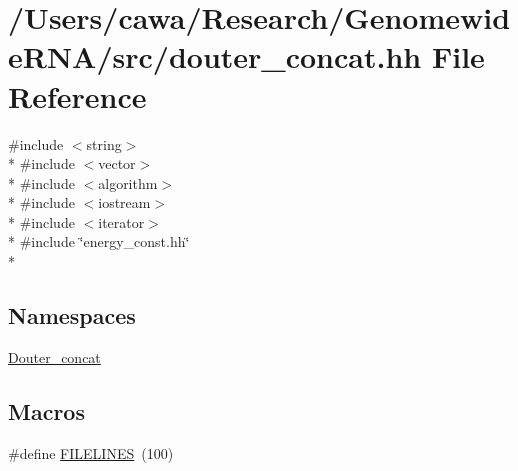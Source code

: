 \hypertarget{douter__concat_8hh}{\section{/\+Users/cawa/\+Research/\+Genomewide\+R\+N\+A/src/douter\+\_\+concat.hh File Reference}
\label{douter__concat_8hh}
}
{\ttfamily \#include $<$string$>$}\\*
{\ttfamily \#include $<$vector$>$}\\*
{\ttfamily \#include $<$algorithm$>$}\\*
{\ttfamily \#include $<$iostream$>$}\\*
{\ttfamily \#include $<$iterator$>$}\\*
{\ttfamily \#include \char`\"{}energy\+\_\+const.\+hh\char`\"{}}\\*
\subsection*{Namespaces}
\begin{DoxyCompactItemize}
\item 
 \hyperlink{namespace_douter__concat}{Douter\+\_\+concat}
\end{DoxyCompactItemize}
\subsection*{Macros}
\begin{DoxyCompactItemize}
\item 
\#define \hyperlink{douter__concat_8hh_ad3b770b661fc5cdd44d05e924cd76a12}{F\+I\+L\+E\+L\+I\+N\+E\+S}~(100)
\end{DoxyCompactItemize}
